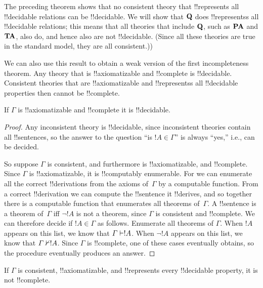 \documentclass[../../../include/open-logic-section]{subfiles}
\begin{document}
\begin{explain}
The preceding theorem shows that no consistent theory that
!!{represents} all !!{decidable} relations can be !!{decidable}. We
will show that $\mathbf{Q}$ does !!{represents}s all !!{decidable}
relations; this means that all theories that include $\mathbf{Q}$, such as
$\mathbf{PA}$ and $\mathbf{TA}$, also do, and hence also are not
!!{decidable}. (Since all these theories are true in the standard
model, they are all consistent.))

We can also use this result to obtain a weak version of the first
incompleteness theorem.  Any theory that is !!{axiomatizable} and
!!{complete} is !!{decidable}.  Consistent theories that are
!!{axiomatizable} and !!{represents}s all !!{decidable} properties
then cannot be !!{complete}.
\end{explain}

\begin{thm}
If $\Gamma$ is !!{axiomatizable} and !!{complete} it is !!{decidable}.
\end{thm}

\begin{proof}
Any inconsistent theory is !!{decidable}, since inconsistent theories
contain all !!{sentence}s, so the answer to the question ``is $!A \in
\Gamma$'' is always ``yes,'' i.e., can be decided.

So suppose $\Gamma$ is consistent, and furthermore is
!!{axiomatizable}, and !!{complete}. Since $\Gamma$ is
!!{axiomatizable}, it is !!{computably enumerable}. For we can
enumerate all the correct !!{derivation}s from the axioms of~$\Gamma$
by a computable function. From a correct !!{derivation} we can compute
the !!{sentence} it !!{derive}s, and so together there is a computable
function that enumerates all theorems of~$\Gamma$.  A !!{sentence} is
a theorem of~$\Gamma$ iff $\lnot !A$ is not a theorem, since $\Gamma$
is consistent and !!{complete}.  We can therefore decide if $!A \in
\Gamma$ as follows. Enumerate all theorems of $\Gamma$. When $!A$
appears on this list, we know that $\Gamma \Proves !A$. When $\lnot
!A$ appears on this list, we know that $\Gamma \Proves/ !A$.  Since
$\Gamma$ is !!{complete}, one of these cases eventually obtains, so
the procedure eventually produces an answer.
\end{proof}

\begin{cor}
If $\Gamma$ is consistent, !!{axiomatizable}, and !!{represents} every
!!{decidable} property, it is not !!{complete}.
\end{cor}
\end{document}
